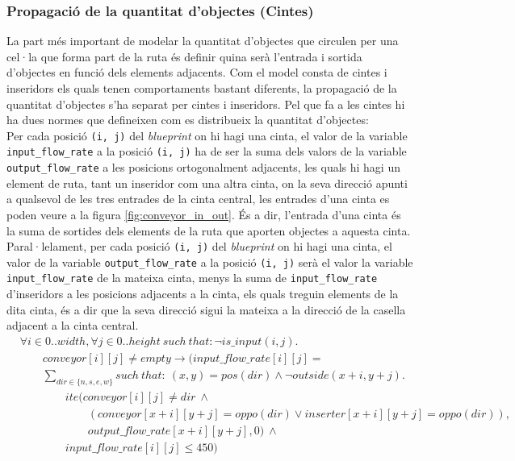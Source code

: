 \subsubsection{Propagació de la quantitat d'objectes (Cintes)}
La part més important de modelar la quantitat d'objectes que circulen per una cel·la que forma part de la ruta és definir quina serà l'entrada i sortida d'objectes en funció dels elements adjacents. Com el model consta de cintes i inseridors els quals tenen comportaments bastant diferents, la propagació de la quantitat d'objectes s'ha separat per cintes i inseridors.
Pel que fa a les cintes hi ha dues normes que defineixen com es distribueix la quantitat d'objectes:\\
Per cada posició \lstinline{(i, j)} del \textit{blueprint} on hi hagi una cinta, el valor de la variable \lstinline{input_flow_rate} a la posició \lstinline{(i, j)} ha de ser la suma dels valors de la variable \lstinline{output_flow_rate} a les posicions ortogonalment adjacents, les quals hi hagi un element de ruta, tant un inseridor com una altra cinta, on la seva direcció apunti a qualsevol de les tres entrades de la cinta central, les entrades d'una cinta es poden veure a la figura \ref{fig:conveyor_in_out}. És a dir, l'entrada d'una cinta és la suma de sortides dels elements de la ruta que aporten objectes a aquesta cinta.\\
Paral·lelament, per cada posició \lstinline{(i, j)} del \textit{blueprint} on hi hagi una cinta, el valor de la variable \lstinline{output_flow_rate} a la posició \lstinline{(i, j)} serà el valor la variable \lstinline{input_flow_rate} de la mateixa cinta, menys la suma de \lstinline{input_flow_rate} d'inseridors a les posicions adjacents a la cinta, els quals treguin elements de la dita cinta, és a dir que la seva direcció sigui la mateixa a la direcció de la casella adjacent a la cinta central.\\
\begin{align*}
    &\forall i \in 0..width, \forall j \in 0..height \ such \ that: \neg is\_input(i,j).\\
    &\qquad conveyor[i][j]\neq empty \rightarrow (input\_flow\_rate[i][j]=\\
    &\qquad \sum_{dir \in \{n, s, e, w\}} such \ that: \ (x, y)=pos(dir) \land \neg outside(x+i,y+j).\\
    &\qquad \qquad ite\Big(conveyor[i][j]\neq dir \ \land\\
    &\qquad \qquad \qquad (conveyor[x+i][y+j] = oppo(dir)\lor inserter[x+i][y+j]=oppo(dir)),\\
    &\qquad \qquad \qquad output\_flow\_rate[x+i][y+j], 0\Big) \ \land \\
    &\qquad \qquad input\_flow\_rate[i][j]\leq450)
\end{align*}

